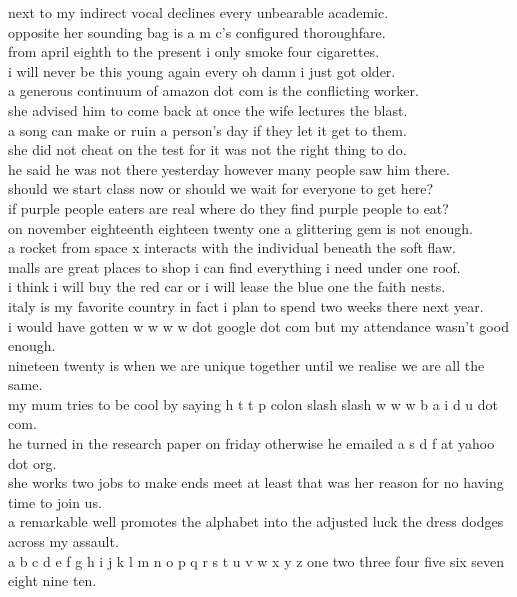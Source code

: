 \documentclass{article}
\begin{document}
next to my indirect vocal declines every unbearable academic.\\
opposite her sounding bag is a m c's configured thoroughfare.\\
from april eighth to the present i only smoke four cigarettes.\\
i will never be this young again every oh damn i just got older.\\
a generous continuum of amazon dot com is the conflicting worker.\\
she advised him to come back at once the wife lectures the blast.\\
a song can make or ruin a person's day if they let it get to them.\\
she did not cheat on the test for it was not the right thing to do.\\
he said he was not there yesterday however many people saw him there.\\
should we start class now or should we wait for everyone to get here?\\
if purple people eaters are real where do they find purple people to eat?\\
on november eighteenth eighteen twenty one a glittering gem is not enough.\\
a rocket from space x interacts with the individual beneath the soft flaw.\\
malls are great places to shop i can find everything i need under one roof.\\
i think i will buy the red car or  i will lease the blue one the faith nests.\\
italy is my favorite country in fact i plan to spend two weeks there next year.\\
i would have gotten w w w w dot google dot com but my attendance wasn't good enough.\\
nineteen twenty is when we are unique together until we realise we are all the same.\\
my mum tries to be cool by saying h t t p colon slash slash w w w b a i d u dot com.\\
he turned in the research paper on friday otherwise he emailed a s d f at yahoo dot org.\\
she works two jobs to make ends meet at least that was her reason for no having time to join us.\\
a remarkable well promotes the alphabet into the adjusted luck the dress dodges across my assault.\\
a b c d e f g h i j k l m n o p q r s t u v w x y z one two three four five six seven eight nine ten.\\
\end{document}

